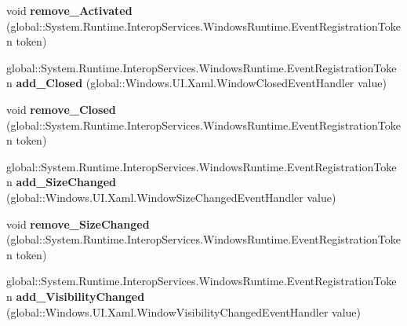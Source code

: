 \begin{DoxyCompactItemize}
\mbox{\label{class_windows_1_1_u_i_1_1_xaml_1_1_window_a3d1b79b4484e987c7e8e39d71b41c7f6}} 
void {\bfseries remove\+\_\+\+Activated} (global\+::\+System.\+Runtime.\+Interop\+Services.\+Windows\+Runtime.\+Event\+Registration\+Token token)
\item 
\mbox{\label{class_windows_1_1_u_i_1_1_xaml_1_1_window_adb7cdb439992e4bd48b89f73f5654c16}} 
global\+::\+System.\+Runtime.\+Interop\+Services.\+Windows\+Runtime.\+Event\+Registration\+Token {\bfseries add\+\_\+\+Closed} (global\+::\+Windows.\+U\+I.\+Xaml.\+Window\+Closed\+Event\+Handler value)
\item 
\mbox{\label{class_windows_1_1_u_i_1_1_xaml_1_1_window_af4dfd22097abcbe56cc5002bf87ef515}} 
void {\bfseries remove\+\_\+\+Closed} (global\+::\+System.\+Runtime.\+Interop\+Services.\+Windows\+Runtime.\+Event\+Registration\+Token token)
\item 
\mbox{\label{class_windows_1_1_u_i_1_1_xaml_1_1_window_a883a42ba036296bce22db4dd54a0e00b}} 
global\+::\+System.\+Runtime.\+Interop\+Services.\+Windows\+Runtime.\+Event\+Registration\+Token {\bfseries add\+\_\+\+Size\+Changed} (global\+::\+Windows.\+U\+I.\+Xaml.\+Window\+Size\+Changed\+Event\+Handler value)
\item 
\mbox{\label{class_windows_1_1_u_i_1_1_xaml_1_1_window_a5241aefc4f3d8ef6c34cb6aeaef63884}} 
void {\bfseries remove\+\_\+\+Size\+Changed} (global\+::\+System.\+Runtime.\+Interop\+Services.\+Windows\+Runtime.\+Event\+Registration\+Token token)
\item 
\mbox{\label{class_windows_1_1_u_i_1_1_xaml_1_1_window_afb2f2c85c54f1a082f2cdb9cac5b875c}} 
global\+::\+System.\+Runtime.\+Interop\+Services.\+Windows\+Runtime.\+Event\+Registration\+Token {\bfseries add\+\_\+\+Visibility\+Changed} (global\+::\+Windows.\+U\+I.\+Xaml.\+Window\+Visibility\+Changed\+Event\+Handler value)
\item 
\mbox{\label{class_windows_1_1_u_i_1_1_xaml_1_1_window_ad984391809f48d0412161ff575cd570d}} 

\end{DoxyCompactItemize}
